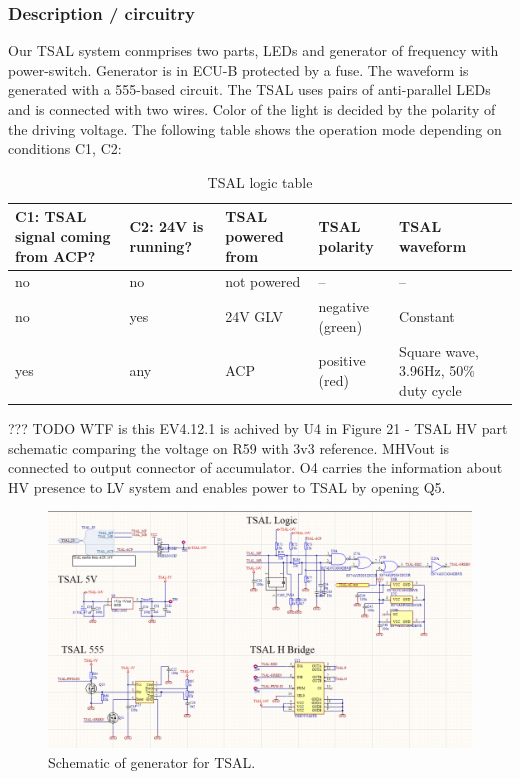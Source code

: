 \subsubsection{Description / circuitry}

Our TSAL system conmprises two parts, LEDs and generator of frequency with power-switch. Generator is in ECU-B protected by a fuse. The waveform is generated with a 555-based circuit. The TSAL uses pairs of anti-parallel LEDs and is connected with two wires. Color of the light is decided by the polarity of the driving voltage. The following table shows the operation mode depending on conditions C1, C2:

\begin{table}[H]
	\centering
	\caption{TSAL logic table}
	\begin{tabularx}{\textwidth}{|X|X|X|X|X|}
		\hline
		\textbf{C1: TSAL signal coming from ACP?} & \textbf{C2: 24V is running?} & \textbf{TSAL powered from} & \textbf{TSAL polarity} & \textbf{TSAL waveform} \\
		\hline
		no & no & not powered & -- & -- \\
		\hline
		no & yes & 24V GLV & negative (green) & Constant \\
		\hline
		yes & any & ACP & positive (red) & Square wave, 3.96Hz, 50\% duty cycle \\
		\hline
	\end{tabularx}%
\end{table}%

??? TODO WTF is this
EV4.12.1 is achived by U4 in Figure 21 - TSAL HV part schematic comparing the voltage on R59 with 3v3 reference. MHVout is connected to output connector of accumulator. O4 carries the information about HV presence to LV system and enables power to TSAL by opening Q5.

\begin{figure}[H]
	\centering
	\includegraphics[width=\textwidth]{./img/TSAL-ECUB-schematic.png}
	\caption{Schematic of generator for TSAL.}
	\label{fig:TSAL-ECUB-schematic}
\end{figure}

